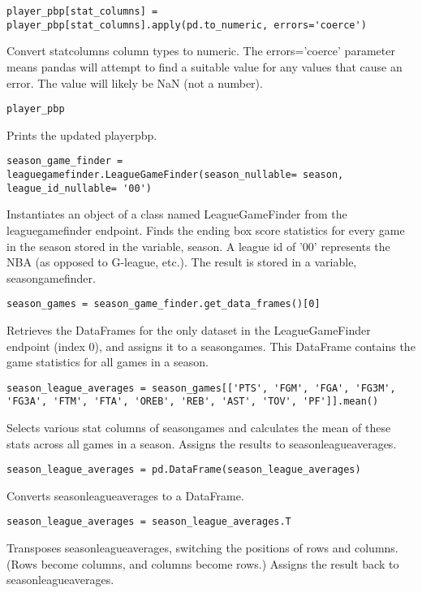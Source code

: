 \documentclass{article}
\begin{document}
\begin{lstlisting}
player_pbp[stat_columns] = player_pbp[stat_columns].apply(pd.to_numeric, errors='coerce')
\end{lstlisting}
Convert stat\textunderscore columns column types to numeric. The errors='coerce' parameter means pandas will attempt to find a suitable value for any values that cause an error. The value will likely be NaN (not a number).
\begin{lstlisting}
player_pbp
\end{lstlisting}
Prints the updated player\textunderscore pbp.
\begin{lstlisting}
season_game_finder = leaguegamefinder.LeagueGameFinder(season_nullable= season, league_id_nullable= '00')
\end{lstlisting}
Instantiates an object of a class named LeagueGameFinder from the leaguegamefinder endpoint. Finds the ending box score statistics for every game in the season stored in the variable, season. A league id of '00' represents the NBA (as opposed to G-league, etc.). The result is stored in a variable, season\textunderscore game\textunderscore finder.
\begin{lstlisting}
season_games = season_game_finder.get_data_frames()[0]
\end{lstlisting}
Retrieves the DataFrames for the only dataset in the LeagueGameFinder endpoint (index 0), and assigns it to a season\textunderscore games. This DataFrame contains the game statistics for all games in a season.
\begin{lstlisting}
season_league_averages = season_games[['PTS', 'FGM', 'FGA', 'FG3M', 'FG3A', 'FTM', 'FTA', 'OREB', 'REB', 'AST', 'TOV', 'PF']].mean()
\end{lstlisting}
Selects various stat columns of season\textunderscore games and calculates the mean of these stats across all games in a season. Assigns the results to season\textunderscore league\textunderscore averages.
\begin{lstlisting}
season_league_averages = pd.DataFrame(season_league_averages)
\end{lstlisting}
Converts season\textunderscore league\textunderscore averages to a DataFrame.
\begin{lstlisting}
season_league_averages = season_league_averages.T
\end{lstlisting}
Transposes season\textunderscore league\textunderscore averages, switching the positions of rows and columns. (Rows become columns, and columns become rows.) Assigns the result back to season\textunderscore league\textunderscore averages.
\end{document}
